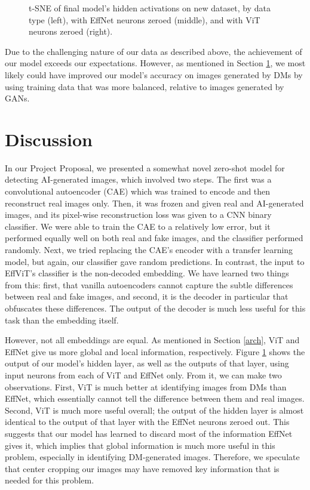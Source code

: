 \documentclass{article} %
\begin{document}
\begin{figure}[h]
\begin{center}
    \end{center}
    \caption{t-SNE of final model's hidden activations on new dataset, by data type (left), with EffNet neurons zeroed (middle), and with ViT neurons zeroed (right).}
    \label{fig:new_data_tsne}
\end{figure}

Due to the challenging nature of our data as described above, the achievement of our model exceeds our expectations. However, as mentioned in Section \ref{discussion}, we most likely could have improved our model's accuracy on images generated by DMs by using training data that was more balanced, relative to images generated by GANs.

\section{Discussion}
\label{discussion}

In our Project Proposal, we presented a somewhat novel zero-shot model for detecting AI-generated images, which involved two steps. The first was a convolutional autoencoder (CAE) which was trained to encode and then reconstruct real images only. Then, it was frozen and given real and AI-generated images, and its pixel-wise reconstruction loss was given to a CNN binary classifier. We were able to train the CAE to a relatively low error, but it performed equally well on both real and fake images, and the classifier performed randomly. Next, we tried replacing the CAE's encoder with a transfer learning model, but again, our classifier gave random predictions. In contrast, the input to EffViT's classifier is the non-decoded embedding. We have learned two things from this: first, that vanilla autoencoders cannot capture the subtle differences between real and fake images, and second, it is the decoder in particular that obfuscates these differences. The output of the decoder is much less useful for this task than the embedding itself.

However, not all embeddings are equal. As mentioned in Section \ref{arch}, ViT and EffNet give us more global and local information, respectively. Figure \ref{fig:new_data_tsne} shows the output of our model's hidden layer, as well as the outputs of that layer, using input neurons from each of ViT and EffNet only. From it, we can make two observations. First, ViT is much better at identifying images from DMs than EffNet, which essentially cannot tell the difference between them and real images. Second, ViT is much more useful overall; the output of the hidden layer is almost identical to the output of that layer with the EffNet neurons zeroed out. This suggests that our model has learned to discard most of the information EffNet gives it, which implies that global information is much more useful in this problem, especially in identifying DM-generated images. Therefore, we speculate that center cropping our images may have removed key information that is needed for this problem.
\end{document}
